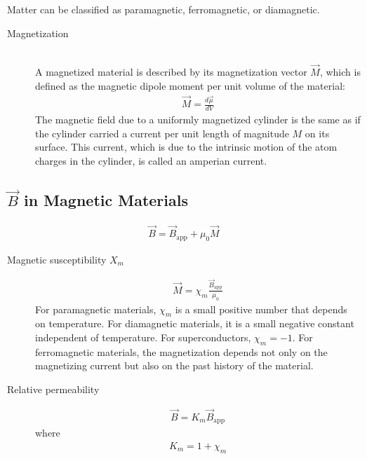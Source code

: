\documentclass[../main.tex]{subfiles}
\begin{document}
Matter can be classified as paramagnetic, ferromagnetic, or diamagnetic.

\begin{description}
  \item[Magnetization] \hfill \\
    A magnetized material is described by its magnetization vector $\vec{M}$,
    which is defined as the magnetic dipole moment per unit volume of the
    material:
    \begin{align}
      \vec{M} = \frac{d\vec{\mu}}{dV}
    \end{align}
    The magnetic field due to a uniformly magnetized cylinder is the same as if
    the cylinder carried a current per unit length of magnitude $M$ on its
    surface. This current, which is due to the intrinsic motion of the atom
    charges in the cylinder, is called an amperian current.
\end{description}

\subsection{$\vec{B}$ in Magnetic Materials}
\label{sub:_b_in_magentic_materials}

\begin{align}
  \vec{B} = \vec{B}_\text{app} + \mu_0\vec{M}
\end{align}

\begin{description}
  \item[Magnetic susceptibility $X_m$]
    \begin{align}
      \vec{M} = \chi_m\frac{\vec{B}_\text{app}}{\mu_0}
    \end{align}
    For paramagnetic materials, $\chi_m$ is a small positive number that
    depends on temperature. For diamagnetic materials, it is a small negative
    constant independent of temperature. For superconductors, $\chi_m = -1$.
    For ferromagnetic materials, the magnetization depends not only on the
    magnetizing current but also on the past history of the material.
  \item[Relative permeability]
    \begin{align}
      \vec{B} = K_m\vec{B}_\text{app}
    \end{align}
    where
    \begin{align}
       K_m = 1 + \chi_m
    \end{align}
\end{description}
\end{document}
